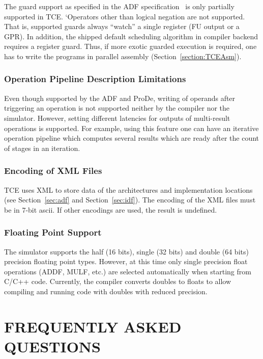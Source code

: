 \documentclass[twoside]{tceusermanual}
\begin{document}
The guard support as specified in the ADF specification~\cite{ADF-specs} is
only partially supported in TCE. `Operators other than logical negation are
not supported. That is, supported guards always ``watch'' a single register
(FU output or a GPR). In addition, the shipped default scheduling algorithm
in compiler backend requires a register guard. Thus, if more exotic guarded
execution is required, one has to write the programs in parallel assembly
(Section~\ref{section:TCEAsm}).

\subsection{Operation Pipeline Description Limitations}

Even though supported by the ADF and ProDe, writing of operands after
triggering an operation is not supported neither by the compiler nor
the simulator. However, setting different latencies for outputs of 
multi-result operations is supported. For example, using this
feature one can have an iterative operation pipeline which computes 
several results which are ready after the count of stages in an iteration.

\subsection{Encoding of XML Files}

TCE uses XML to store data of the architectures and implementation 
locations (see Section~\ref{sec:adf} and Section~\ref{sec:idf}). The
encoding of the XML files must be in 7-bit ascii. If other encodings are
used, the result is undefined.

\subsection{Floating Point Support}

The simulator supports the half (16 bits), single (32 bits) and double
(64 bits) precision floating point types. However, at this time only
single precision float operations (ADDF, MULF, etc.) are selected 
automatically when starting from C/C++ code. Currently, the compiler 
converts doubles to floats to allow compiling and running code with 
doubles with reduced precision.

\appendix

\chapter{FREQUENTLY ASKED QUESTIONS}
\label{chapter:faq}
\end{document}
